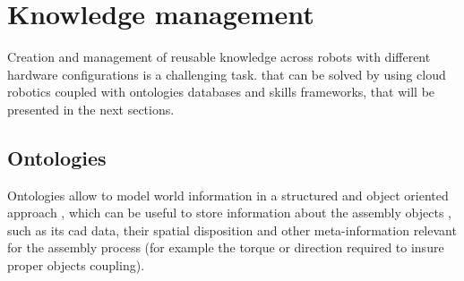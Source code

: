 %
%



\section{Knowledge management}

Creation and management of reusable knowledge across robots with different hardware configurations is a challenging task. that can be solved by using cloud robotics coupled with ontologies databases and skills frameworks, that will be presented in the next sections.


\subsection{Ontologies}

Ontologies allow to model world information in a structured and object oriented approach \cite{Stenmark2015}, which can be useful to store information about the assembly objects \cite{Perzylo2015}, such as its \gls{cad} data, their spatial disposition and other meta-information relevant for the assembly process (for example the torque or direction required to insure proper objects coupling).

